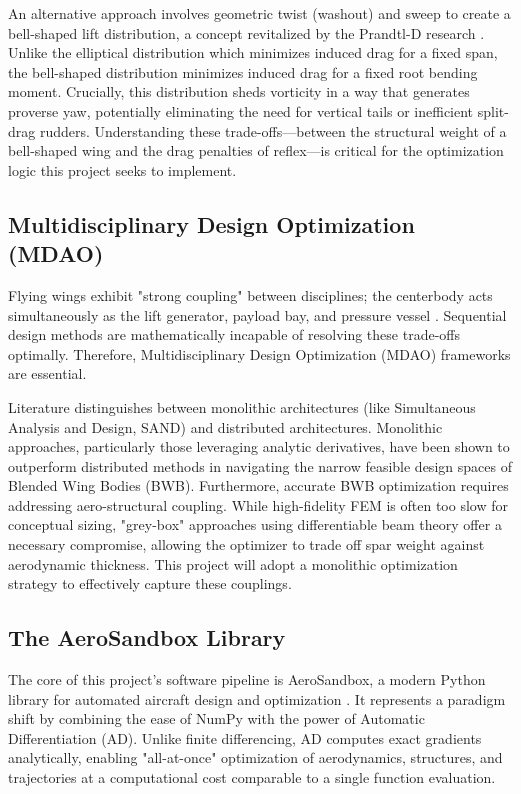 \documentclass[12pt]{article}
\begin{document}
An alternative approach involves geometric twist (washout) and sweep to create a bell-shaped lift distribution, a concept revitalized by the Prandtl-D research \cite{Bowers2023}. Unlike the elliptical distribution which minimizes induced drag for a fixed span, the bell-shaped distribution minimizes induced drag for a fixed root bending moment. Crucially, this distribution sheds vorticity in a way that generates proverse yaw, potentially eliminating the need for vertical tails or inefficient split-drag rudders. Understanding these trade-offs—between the structural weight of a bell-shaped wing and the drag penalties of reflex—is critical for the optimization logic this project seeks to implement.

\subsection{Multidisciplinary Design Optimization (MDAO)}
Flying wings exhibit "strong coupling" between disciplines; the centerbody acts simultaneously as the lift generator, payload bay, and pressure vessel \cite{Harris2013}. Sequential design methods are mathematically incapable of resolving these trade-offs optimally. Therefore, Multidisciplinary Design Optimization (MDAO) frameworks are essential.

Literature distinguishes between monolithic architectures (like Simultaneous Analysis and Design, SAND) and distributed architectures. Monolithic approaches, particularly those leveraging analytic derivatives, have been shown to outperform distributed methods in navigating the narrow feasible design spaces of Blended Wing Bodies (BWB). Furthermore, accurate BWB optimization requires addressing aero-structural coupling. While high-fidelity FEM is often too slow for conceptual sizing, "grey-box" approaches using differentiable beam theory offer a necessary compromise, allowing the optimizer to trade off spar weight against aerodynamic thickness. This project will adopt a monolithic optimization strategy to effectively capture these couplings.

\subsection{The AeroSandbox Library}
The core of this project's software pipeline is AeroSandbox, a modern Python library for automated aircraft design and optimization \cite{Sharpe2024}. It represents a paradigm shift by combining the ease of NumPy with the power of Automatic Differentiation (AD). Unlike finite differencing, AD computes exact gradients analytically, enabling "all-at-once" optimization of aerodynamics, structures, and trajectories at a computational cost comparable to a single function evaluation.
\end{document}
